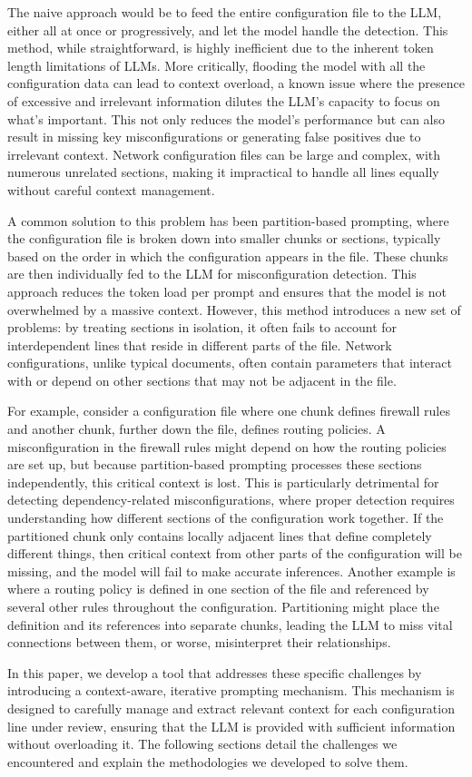 The naive approach would be to feed the entire configuration file to the LLM, either all at once or progressively, and let the model handle the detection. This method, while straightforward, is highly inefficient due to the inherent token length limitations of LLMs. More critically, flooding the model with all the configuration data can lead to context overload, a known issue where the presence of excessive and irrelevant information dilutes the LLM’s capacity to focus on what’s important. This not only reduces the model’s performance but can also result in missing key misconfigurations or generating false positives due to irrelevant context. Network configuration files can be large and complex, with numerous unrelated sections, making it impractical to handle all lines equally without careful context management.

A common solution to this problem has been partition-based prompting, where the configuration file is broken down into smaller chunks or sections, typically based on the order in which the configuration appears in the file. These chunks are then individually fed to the LLM for misconfiguration detection. This approach reduces the token load per prompt and ensures that the model is not overwhelmed by a massive context. However, this method introduces a new set of problems: by treating sections in isolation, it often fails to account for interdependent lines that reside in different parts of the file. Network configurations, unlike typical documents, often contain parameters that interact with or depend on other sections that may not be adjacent in the file.

For example, consider a configuration file where one chunk defines firewall rules and another chunk, further down the file, defines routing policies. A misconfiguration in the firewall rules might depend on how the routing policies are set up, but because partition-based prompting processes these sections independently, this critical context is lost. This is particularly detrimental for detecting dependency-related misconfigurations, where proper detection requires understanding how different sections of the configuration work together. If the partitioned chunk only contains locally adjacent lines that define completely different things, then critical context from other parts of the configuration will be missing, and the model will fail to make accurate inferences.
Another example is where a routing policy is defined in one section of the file and referenced by several other rules throughout the configuration. Partitioning might place the definition and its references into separate chunks, leading the LLM to miss vital connections between them, or worse, misinterpret their relationships.

In this paper, we develop a tool that addresses these specific challenges by introducing a context-aware, iterative prompting mechanism. This mechanism is designed to carefully manage and extract relevant context for each configuration line under review, ensuring that the LLM is provided with sufficient information without overloading it. The following sections detail the challenges we encountered and explain the methodologies we developed to solve them.
